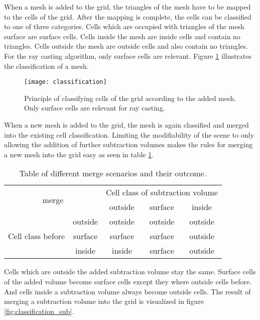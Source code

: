 When a mesh is added to the grid, the triangles of the mesh have to be mapped to the cells of the grid. After the mapping is complete, the cells can be classified to one of three categories. Cells which are occupied with triangles of the mesh surface are surface cells. Cells inside the mesh are inside cells and contain no triangles. Cells outside the mesh are outside cells and also contain no triangles. For the ray casting algorithm, only surface cells are relevant. Figure \ref{fig:classification} illustrates the classification of a mesh.

\begin{figure}
\centering
\texttt{[image: classification]}
\caption{Principle of classifying cells of the grid according to the added mesh. Only surface cells are relevant for ray casting.}
\label{fig:classification}
\end{figure}

When a new mesh is added to the grid, the mesh is again classified and merged into the existing cell classification. Limiting the modifiability of the scene to only allowing the addition of further subtraction volumes makes the rules for merging a new mesh into the grid easy as seen in table \ref{tbl:classification_rules}.

\begin{table}[h]
\centering
\begin{tabular}{|c|c|c|c|c|}
\hline
\multicolumn{2}{|c|}{\multirow{2}{*}{merge}} & \multicolumn{3}{c|}{Cell class of subtraction volume} \\
\cline{3-5}
\multicolumn{2}{|c|}{} & outside & surface & inside \\
 \hline
\multirow{3}{*}{Cell class before} & outside & outside & outside & outside \\
\cline{2-5}
 & surface & surface & surface & outside \\
\cline{2-5}
 & inside & inside & surface & outside \\
\hline
\end{tabular}
\caption{Table of different merge scenarios and their outcome.}
\label{tbl:classification_rules}
\end{table}

Cells which are outside the added subtraction volume stay the same. Surface cells of the added volume become surface cells except they where outside cells before. And cells inside a subtraction volume always become outside cells. The result of merging a subtraction volume into the grid is visualized in figure \ref{fig:classification_sub}.

